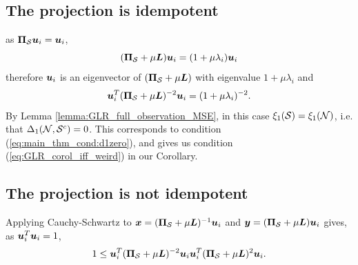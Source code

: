 \subsection{The projection is idempotent}
\label{subapp:GLR_iff_proof:idempotent}
as $\proj{S}\vect{u}_{i} = \vect{u}_{i}$,
\begin{equation}
   (\proj{S} + \mu \matr{L})\vect{u}_{i} = (1 + \mu\lambda_{i})\vect{u}_{i} 
\end{equation}
therefore $\bm{u}_{i}$ is an eigenvector of $(\proj{S} + \mu \matr{L})$ with eigenvalue $1 + \mu\lambda_{i}$ and
\begin{align}
    \vect{u}_{i}^{T}(\proj{S} + \mu \matr{L})^{-2}\vect{u}_{i} = (1 + \mu\lambda_{i})^{-2}.
\end{align}
By Lemma \ref{lemma:GLR_full_observation_MSE}, in this case $\xi_{1}(\mathcal{S}) = \xi_{1}(\mathcal{N})$, i.e. that $\Delta_{1}(\mathcal{N},\mathcal{S}^{c}) = 0$. This corresponds to condition (\ref{eq:main_thm_cond:d1zero}), and gives us condition (\ref{eq:GLR_corol_iff_weird}) in our Corollary.

\subsection{The projection is not idempotent}
Applying Cauchy-Schwartz to $\vect{x} = (\proj{S} + \mu \matr{L})^{-1}\vect{u}_{i}$ and  $\vect{y} = (\proj{S} + \mu \matr{L})\vect{u}_{i}$ gives, as $\bm{u}_{i}^{T}\bm{u}_{i} = 1$,
\begin{align}
    1 \leq \vect{u}_{i}^{T}(\proj{S} + \mu \matr{L})^{-2}\vect{u}_{i} \vect{u}_{i}^{T}(\proj{S} + \mu \matr{L})^{2}\vect{u}_{i}. \label{eq:cs_for_non_idempotent_GLR_proj}
\end{align}

